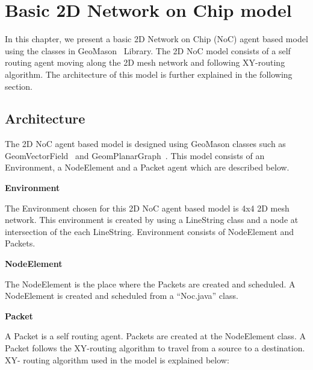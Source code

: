 \chapter{Basic 2D Network on Chip model}
\label{Chapter.five}

In this chapter, we present a basic 2D Network on Chip (NoC) agent based model using the classes in GeoMason~\cite{GEOMASON2011,GEOMASON} Library. The 2D NoC model consists of a self routing agent moving along the 2D mesh network and following XY-routing algorithm. The architecture of this model is further explained in the following section. 

\section{Architecture}

The 2D NoC agent based model is designed using GeoMason classes such as GeomVectorField~\cite{GEOMV} and GeomPlanarGraph~\cite{GEOMPG}. This model consists of an Environment, a NodeElement and a Packet agent which are described below. 


\vspace{0.3cm}
\noindent\textbf{Environment}
\vspace{4mm}

\noindent The Environment chosen for this 2D NoC agent based model is 4x4 2D mesh network. This environment is created by using a LineString class and a node at intersection of the each LineString. Environment consists of NodeElement and Packets.

\vspace{0.5cm}
\noindent\textbf{NodeElement}
\vspace{5mm}

\noindent The NodeElement is the place where the Packets are created and scheduled. A NodeElement is created and scheduled from a ``Noc.java'' class.  
 
\vspace{0.3cm}
\noindent\textbf{Packet}
\vspace{5mm}

\noindent A Packet is a self routing agent. Packets are created at the NodeElement class. A Packet follows the XY-routing algorithm to travel from a source to a destination. XY- routing algorithm used in the model is explained below:

